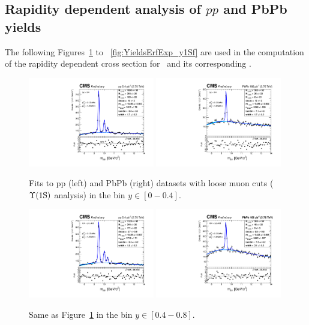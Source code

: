 \subsection{Rapidity dependent analysis of $pp$ and PbPb
  yields}
\label{sec:figs_y}
The following Figures~\ref{fig:YieldsErfExp_y1Sa} to ~\ref{fig:YieldsErfExp_y1Sf} are used in the computation of the rapidity
dependent cross section for \PgUa\ and its corresponding \RAA.
\begin{figure}
  \includegraphics[width=0.49\textwidth]{Chapters/aYield/pp/pt_3p5_4/Rap/Rap_0_0p4/pp2p76tev_Rap_0_0p4_fsr1.pdf}
  \includegraphics[width=0.49\textwidth]{Chapters/aYield/PbPb/pt_3p5_4/Rap/Rap_0_0p4/PbPb_Rap_0_0p4_fsr1.pdf}
  \caption{Fits to pp (left) and PbPb (right) datasets with loose muon cuts ($\Upsilon\mathrm{(1S)}$ analysis) in the bin $y\in [0 - 0.4]$.}
  \label{fig:YieldsErfExp_y1Sa} 
\end{figure}
\begin{figure}
  \includegraphics[width=0.49\textwidth]{Chapters/aYield/pp/pt_3p5_4/Rap/Rap_0p4_0p8/pp2p76tev_Rap_0p4_0p8_fsr1.pdf}
  \includegraphics[width=0.49\textwidth]{Chapters/aYield/PbPb/pt_3p5_4/Rap/Rap_0p4_0p8/PbPb_Rap_0p4_0p8_fsr1.pdf} 
  \caption{Same as Figure~\ref{fig:YieldsErfExp_y1Sa} in the bin $y\in [0.4 - 0.8]$.}
  \label{fig:YieldsErfExp_y1Sb} 
\end{figure}

